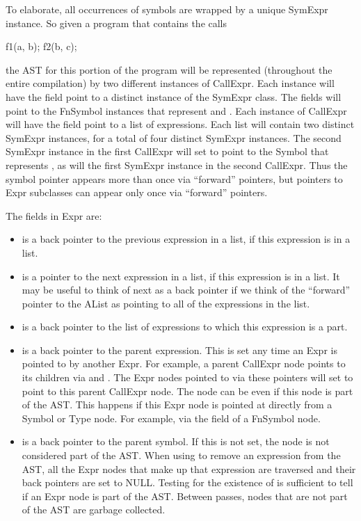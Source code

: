 \documentclass[10pt]{article}
\begin{document}
To elaborate, all occurrences of symbols are wrapped by a unique
SymExpr instance.  So given a program that contains the calls
\begin{chapel}
f1(a, b);
f2(b, c);
\end{chapel}
the AST for this portion of the program will be represented
(throughout the entire compilation) by two different instances of
CallExpr.  Each instance will have the  field point to a
distinct instance of the SymExpr class.  The  fields will
point to the FnSymbol instances that represent  and
.  Each instance of CallExpr will have the  field
point to a list of expressions.  Each list will contain two distinct
SymExpr instances, for a total of four distinct SymExpr instances.
The second SymExpr instance in the first CallExpr will set  to
point to the Symbol that represents , as will the first
SymExpr instance in the second CallExpr.  Thus the symbol pointer
appears more than once via ``forward'' pointers, but pointers to Expr
subclasses can appear only once via ``forward'' pointers.

The fields in Expr are:
\begin{itemize}
\item {} is a back pointer to the previous expression in
  a list, if this expression is in a list.
\item {} is a pointer to the next expression in a list,
  if this expression is in a list.  It may be useful to think of next
  as a back pointer if we think of the ``forward'' pointer to the
  AList as pointing to all of the expressions in the list.
\item {} is a back pointer to the list of expressions to
  which this expression is a part.
\item {} is a back pointer to the parent
  expression.  This is set any time an Expr is pointed to by another
  Expr.  For example, a parent CallExpr node points to its children
  via  and .  The Expr nodes pointed to via
  these pointers will set  to point to this parent
  CallExpr node.  The  node can be  even if
  this node is part of the AST.  This happens if this Expr node is
  pointed at directly from a Symbol or Type node.  For example, via
  the  field of a FnSymbol node.
\item {} is a back pointer to the parent
  symbol.  If this is not set, the node is not considered part of the
  AST.  When using  to remove an expression from the AST,
  all the Expr nodes that make up that expression are traversed and
  their  back pointers are set to NULL.  Testing for
  the existence of  is sufficient to tell if an Expr
  node is part of the AST.  Between passes, nodes that are not part of
  the AST are garbage collected.
\end{itemize}
\end{document}
